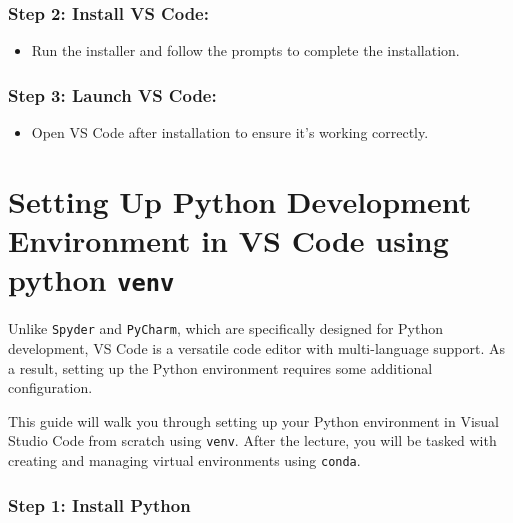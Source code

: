 \documentclass[
  letterpaper,
  DIV=11,
  numbers=noendperiod]{scrreprt}
\providecommand{\tightlist}{%
  \setlength{\itemsep}{0pt}\setlength{\parskip}{0pt}}\usepackage{longtable,booktabs,array}
\begin{document}
\hypertarget{step-2-install-vs-code}{%
\subsubsection{\texorpdfstring{Step 2: \textbf{Install VS
Code:}}{Step 2: Install VS Code:}}\label{step-2-install-vs-code}}

\begin{itemize}
\tightlist
\item
  Run the installer and follow the prompts to complete the installation.
\end{itemize}

\hypertarget{step-3-launch-vs-code}{%
\subsubsection{\texorpdfstring{Step 3: \textbf{Launch VS
Code:}}{Step 3: Launch VS Code:}}\label{step-3-launch-vs-code}}

\begin{itemize}
\tightlist
\item
  Open VS Code after installation to ensure it's working correctly.
\end{itemize}

\hypertarget{setting-up-python-development-environment-in-vs-code-using-python-venv}{%
\section{\texorpdfstring{Setting Up Python Development Environment in VS
Code using python
\texttt{venv}}{Setting Up Python Development Environment in VS Code using python venv}}\label{setting-up-python-development-environment-in-vs-code-using-python-venv}}

Unlike \texttt{Spyder} and \texttt{PyCharm}, which are specifically
designed for Python development, VS Code is a versatile code editor with
multi-language support. As a result, setting up the Python environment
requires some additional configuration.

This guide will walk you through setting up your Python environment in
Visual Studio Code from scratch using \texttt{venv}. After the lecture,
you will be tasked with creating and managing virtual environments using
\texttt{conda}.

\hypertarget{step-1-install-python}{%
\subsubsection{Step 1: Install Python}\label{step-1-install-python}}
\end{document}
